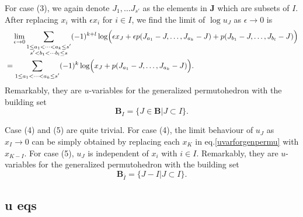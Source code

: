 \documentclass[hidelinks,12pt]{article}
\begin{document}
\begin{enumerate}
For case (3), we again denote $J_{1},\ldots J_{s'}$ as the elements in $\mathbf{J}$ which are subsets of $ I$. After replacing $x_{i}$ with $\epsilon x_{i}$ for $i\in I$, we find the limit of $\log u_{J}$ as $\epsilon \to 0$ is
\begin{align}
  &\quad \lim_{\epsilon\to 0}  \sum_{\substack {1 \leq a_{1}<\cdots<a_{k}\leq s'\\ s'<b_{1}<\cdots b_{l}\leq s}}(-1)^{k+l}\log\Bigl( \epsilon x_{J}+\epsilon p(J_{a_{1}}-J,\ldots,J_{a_{k}}-J) + p(J_{b_{1}}-J,\ldots, J_{b_{l}}-J)\Bigr) \nonumber \\
  &=\sum_{\substack {1 \leq a_{1}<\cdots<a_{k}\leq s'}}(-1)^{k}\log\Bigl( x_{J}+ p(J_{a_{1}}-J,\ldots,J_{a_{k}}-J) \Bigr). 
\end{align}
Remarkably, they are $u$-variables for the generalized permutohedron with the building set
\begin{equation}
   \mathbf{B}_{I} = \{J\in\mathbf{B} \vert J\subset I\}.
\end{equation}

Case (4) and (5) are quite trivial. For case (4), the limit behaviour of $u_{J}$ as $x_{I}\to 0$ can be simply obtained by replacing each $x_{K}$ in eq.\eqref{uvarforgenpermu} with $x_{K-I}$. For case (5), $u_{J}$ is  independent of $x_{i}$ with $i\in I$. Remarkably, they are $u$-variables for the generalized permutohedron with the building set
\begin{equation}
   \mathbf{B}_{\bar{I}} = \{J-I \vert J\subset I\}.
\end{equation}





\subsection{u eqs}


\end{enumerate}
\end{document}
